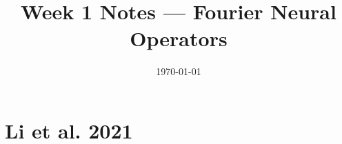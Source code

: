 \documentclass{article}
\title{Week 1 Notes --- Fourier Neural Operators}
\date{\today}
\begin{document}
\maketitle

\section{Li et al. 2021}
\end{document}
